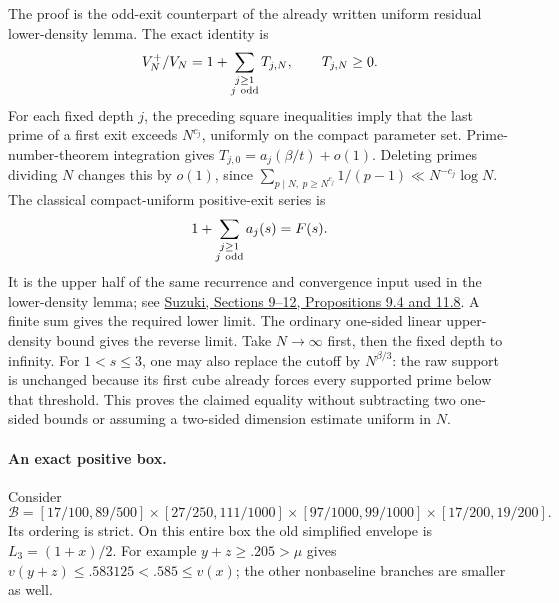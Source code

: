 The proof is the odd-exit counterpart of the already written
uniform residual lower-density lemma. The exact identity is
\[
 V_N^+/V_N=1+\sum_{\substack{j\ge1\\j\ {\rm odd}}}T_{j,N},
 \qquad T_{j,N}\ge0.
\]
For each fixed depth \(j\), the preceding square inequalities imply
that the last prime of a first exit exceeds \(N^{c_j}\), uniformly
on the compact parameter set. Prime-number-theorem integration gives
\(T_{j,0}=a_j(\beta/t)+o(1)\).
Deleting primes dividing \(N\) changes this by \(o(1)\), since
\(\sum_{p\mid N,\ p\ge N^{c_j}}1/(p-1)
 \ll N^{-c_j}\log N\).
The classical compact-uniform positive-exit series is
\[
 1+\sum_{\substack{j\ge1\\j\ {\rm odd}}}a_j(s)=F(s).
\]
It is the upper half of the same recurrence and convergence input
used in the lower-density lemma; see
\href{https://www.suzuyu1729.com/notes/NagoyaSeminar2022/RosserIwaniec.pdf}
{Suzuki, Sections 9--12, Propositions 9.4 and 11.8}.
A finite sum gives the required lower limit. The ordinary one-sided
linear upper-density bound gives the reverse limit.
Take \(N\to\infty\) first, then the fixed depth to infinity.
For \(1<s\le3\), one may also replace the cutoff by \(N^{\beta/3}\):
the raw support is unchanged because its first cube already forces
every supported prime below that threshold.
This proves the claimed equality without subtracting two one-sided
bounds or assuming a two-sided dimension estimate uniform in \(N\).

\paragraph{An exact positive box.}
Consider
\[
 \mathcal B=
 [17/100,89/500]\times[27/250,111/1000]
 \times[97/1000,99/1000]\times[17/200,19/200].
\]
Its ordering is strict. On this entire box the old simplified
envelope is \(L_3=(1+x)/2\).
For example \(y+z\ge.205>\mu\) gives
\(v(y+z)\le.583125<.585\le v(x)\); the other nonbaseline
branches are smaller as well.


